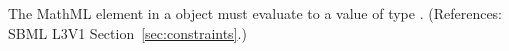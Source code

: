 The MathML  element in a \Constraint object must evaluate to a
value of type .  (References: SBML L3V1
Section~\ref{sec:constraints}.)
